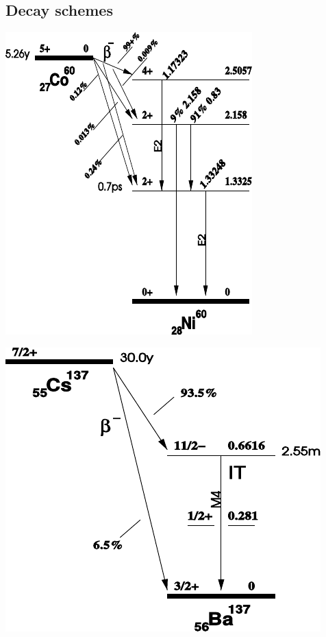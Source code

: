\subsection*{Decay schemes}
%
\vspace{10mm}
%
\begin{multicols}{2}
%
\minipage{\linewidth}
    \begin{center}
        \captionsetup{type=figure}
        \begin{adjustbox}{max width=\linewidth, keepaspectratio}
            \includegraphics[]{pdf/DecayScheme60Co}
        \end{adjustbox}
        \label{fig:60CoDecayScheme}
    \end{center}
\endminipage
%
\vspace{10mm}
%
\minipage{\linewidth}
    \begin{center}
        \captionsetup{type=figure}
        \begin{adjustbox}{max width=\linewidth, keepaspectratio}
            \includegraphics[]{pdf/DecayScheme137Cs}

\end{adjustbox}
\end{center}
\end{multicols}

